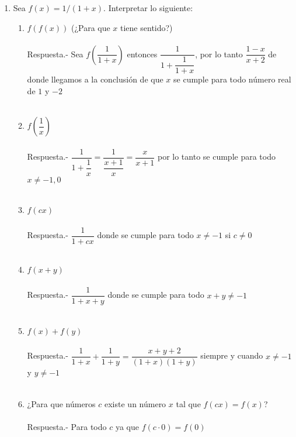     \begin{enumerate}

	\item Sea $f(x)=1/(1+x)$. Interpretar lo siguiente:
	    \begin{enumerate}[\bfseries (i)]

		\item $f(f(x))$ (¿Para que $x$ tiene sentido?)\\\\
		Respuesta.- \; Sea $f\left( \dfrac{1}{1+x} \right)$ entonces $\dfrac{1}{1 + \dfrac{1}{1+x}}$, por lo tanto $\dfrac{1-x}{x+2}$ de donde llegamos a la conclusión de que $x$ se cumple para todo número real de $1$ y $-2$\\\\

		\item $f\left( \dfrac{1}{x} \right)$\\\\
		Respuesta.- \; $\dfrac{1}{1 + \dfrac{1}{x}}=\dfrac{1}{\dfrac{x+1}{x}}=\dfrac{x}{x+1}$ por lo tanto se cumple para todo $x\neq -1, 0$\\\\

		\item $f(cx)$\\\\
		Respuesta.- \; $\dfrac{1}{1+cx}$ donde se cumple para todo $x\neq -1$ si $c\neq 0$\\\\

		\item $f(x+y)$\\\\
		Respuesta.- \; $\dfrac{1}{1+x+y}$ donde se cumple para todo $x+y\neq-1$\\\\

		\item $f(x) + f(y)$\\\\
		Respuesta.- \; $\dfrac{1}{1+x} + \dfrac{1}{1+y}=\dfrac{x+y+2}{(1+x)(1+y)}$ siempre y cuando $x\neq-1$ y $y \neq -1$\\\\

		\item ¿Para que números $c$ existe un número $x$ tal que $f(cx)=f(x)$?\\\\
		Respuesta.- \; Para todo $c$ ya que $f(c\cdot 0)=f(0)$\\\\


\end{enumerate}
\end{enumerate}
